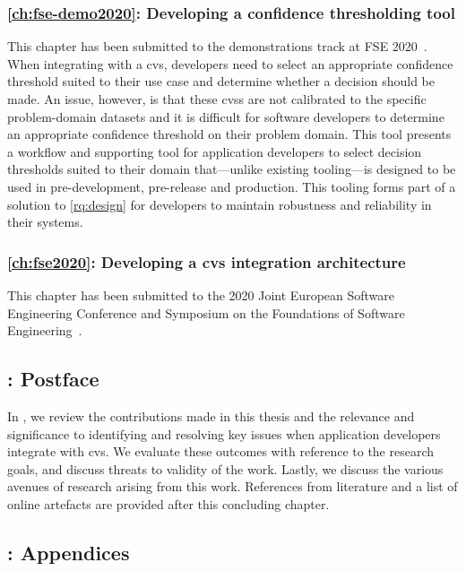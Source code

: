 \subsubsection{\cref{ch:fse-demo2020}: Developing a confidence thresholding tool} This chapter has been submitted to the demonstrations track at FSE 2020~\citep{Cummaudo:2020fse-demo}. When integrating with a \gls{cvs}, developers need to select an appropriate confidence threshold suited to their use case and determine whether a decision should be made. An issue, however, is that these \glspl{cvs} are not calibrated to the specific problem-domain datasets and it is difficult for software developers to determine an appropriate confidence threshold on their problem domain. This tool presents a workflow and supporting tool for application developers to select decision thresholds suited to their domain that---unlike existing tooling---is designed to be used in pre-development, pre-release and production. This tooling forms part of a solution to \ref{rq:design} for developers to maintain robustness and reliability in their systems.

\subsubsection{\cref{ch:fse2020}: Developing a \gls{cvs} integration architecture} This chapter has been submitted to the 2020 Joint European Software Engineering Conference and Symposium on the Foundations of Software Engineering~\citep{Cummaudo:2020fse}. 

\subsection{: Postface}

In , we review the contributions made in this thesis and the relevance and significance to identifying and resolving key issues when application developers integrate with \gls{cvs}. We evaluate these outcomes with reference to the research goals, and discuss threats to validity of the work. Lastly, we discuss the various avenues of research arising from this work. References from literature and a list of online artefacts are provided after this concluding chapter.

\subsection{: Appendices}

